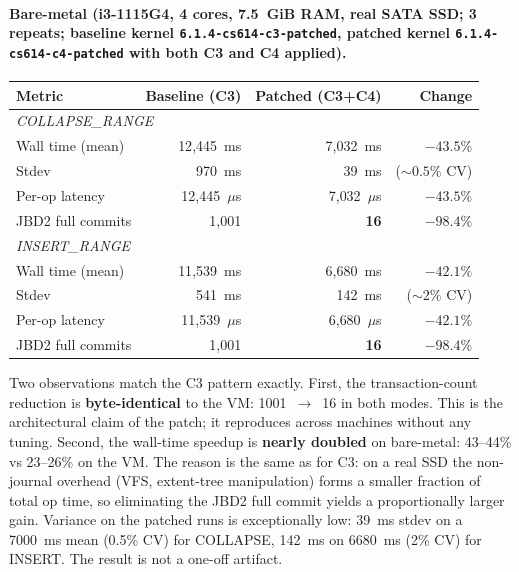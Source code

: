\documentclass[12pt,a4paper]{article}
\begin{document}
\paragraph{Bare-metal (i3-1115G4, 4 cores, 7.5~GiB RAM, real
SATA SSD; 3 repeats; baseline kernel \texttt{6.1.4-cs614-c3-patched},
patched kernel \texttt{6.1.4-cs614-c4-patched} with both C3 and
C4 applied).}

\begin{center}
\begin{tabular}{lrrr}
\toprule
Metric & Baseline (C3) & Patched (C3+C4) & Change \\
\midrule
\multicolumn{4}{l}{\textit{COLLAPSE\_RANGE}} \\
Wall time (mean)     & 12{,}445~ms     & 7{,}032~ms      & $-43.5\%$ \\
Stdev                & 970~ms          & 39~ms            & (${\sim}0.5\%$ CV) \\
Per-op latency       & 12{,}445~$\mu$s & 7{,}032~$\mu$s  & $-43.5\%$ \\
JBD2 full commits    & 1{,}001 & \textbf{16} & $\mathbf{-98.4\%}$ \\
\midrule
\multicolumn{4}{l}{\textit{INSERT\_RANGE}} \\
Wall time (mean)     & 11{,}539~ms     & 6{,}680~ms      & $-42.1\%$ \\
Stdev                & 541~ms          & 142~ms           & (${\sim}2\%$ CV) \\
Per-op latency       & 11{,}539~$\mu$s & 6{,}680~$\mu$s  & $-42.1\%$ \\
JBD2 full commits    & 1{,}001 & \textbf{16} & $\mathbf{-98.4\%}$ \\
\bottomrule
\end{tabular}
\end{center}

Two observations match the C3 pattern exactly.  First, the
transaction-count reduction is \textbf{byte-identical} to the VM:
1001~$\to$~16 in both modes.  This is the architectural claim of
the patch; it reproduces across machines without any tuning.
Second, the wall-time speedup is \textbf{nearly doubled} on
bare-metal: 43--44\% vs 23--26\% on the VM.  The reason is the
same as for C3: on a real SSD the non-journal overhead (VFS,
extent-tree manipulation) forms a smaller fraction of total op
time, so eliminating the JBD2 full commit yields a proportionally
larger gain.  Variance on the patched runs is exceptionally low:
39~ms stdev on a 7000~ms mean (0.5\% CV) for COLLAPSE,
142~ms on 6680~ms (2\% CV) for INSERT.  The result is not a
one-off artifact.
\end{document}
